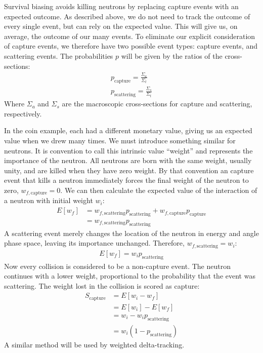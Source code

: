 Survival biasing avoids killing neutrons by replacing capture
events with an expected outcome. As described above, we do not need to
track the outcome of every single event, but can rely on the expected
value. This will give us, on average, the outcome of our many
events. To eliminate our explicit consideration of capture events,
we therefore have two possible event types: capture events, and
scattering events. The probabilities $p$ will be given by the
ratios of the cross-sections:
\begin{align*}
  p_{\mathrm{capture}} = \frac{\Sigma_{a}}{\Sigma_t} \\
  p_{\mathrm{scattering}} = \frac{\Sigma_{s}}{\Sigma_t}
\end{align*}
Where $\Sigma_{a}$ and $\Sigma_{s}$ are the macroscopic cross-sections
for capture and scattering, respectively.

In the coin example, each had a different monetary value, giving us an
expected value when we drew many times. We must introduce something
similar for neutrons. It is convention to call this intrinsic value
``weight'' and represents the importance of the neutron. All neutrons
are born with the same weight, usually unity, and are killed when they
have zero weight. By that convention an capture event that kills a
neutron immediately forces the final weight of the neutron to zero,
$w_{f,\mathrm{capture}} = 0$. We can then calculate the expected
value of the interaction of a neutron with initial weight $w_i$:
\begin{align*}
  E[w_f] &= w_{f,\mathrm{scattering}}p_\mathrm{scattering} +
           w_{f,\mathrm{capture}}p_\mathrm{capture} \\
  &= w_{f,\mathrm{scattering}}p_\mathrm{scattering}
\end{align*}
A scattering event merely changes the location of the neutron in
energy and angle phase space, leaving its importance
unchanged. Therefore, $w_{f,\mathrm{scattering}} = w_i$:
\begin{align*}
  E[w_f] = w_ip_\mathrm{scattering} 
\end{align*}
Now every collision is considered to be a non-capture event. The
neutron continues with a lower weight, proportional to the probability
that the event was scattering. The weight lost in the collision is
scored as capture:
\begin{align*}
  S_\mathrm{capture} &= E[w_i - w_f] \\
  &= E[w_i] - E[w_f] \\
&= w_i - w_ip_\mathrm{scattering} \\
&= w_i(1-p_\mathrm{scattering})
\end{align*}
A similar method will be used by weighted delta-tracking.

